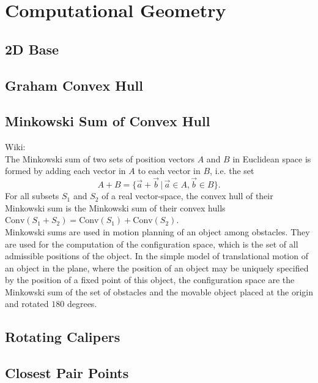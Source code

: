 \documentclass[10pt]{article}
\begin{document}
\section{Computational Geometry}
\subsection{2D Base}

\subsection{Graham Convex Hull}

\subsection{Minkowski Sum of Convex Hull}
\noindent
Wiki: \\
The Minkowski sum of two sets of position vectors $A$ and $B$ in Euclidean space is formed by adding each vector in $A$ to each vector in $B$, i.e. the set
\begin{displaymath}
  A+B=\{ \vec{a} + \vec{b} \, | \, \vec{a} \in A, \vec{b} \in B \}.
\end{displaymath}
For all subsets $S_1$ and $S_2$ of a real vector-space, the convex hull of their Minkowski sum is the Minkowski sum of their convex hulls $\mathrm{Conv} (S_1 + S_2) = \mathrm{Conv} (S_1) + \mathrm{Conv} (S_2)$. \\
Minkowski sums are used in motion planning of an object among obstacles. They are used for the computation of the configuration space, which is the set of all admissible positions of the object. In the simple model of translational motion of an object in the plane, where the position of an object may be uniquely specified by the position of a fixed point of this object, the configuration space are the Minkowski sum of the set of obstacles and the movable object placed at the origin and rotated $180$ degrees. \\

\subsection{Rotating Calipers}

\subsection{Closest Pair Points}

\end{document}
